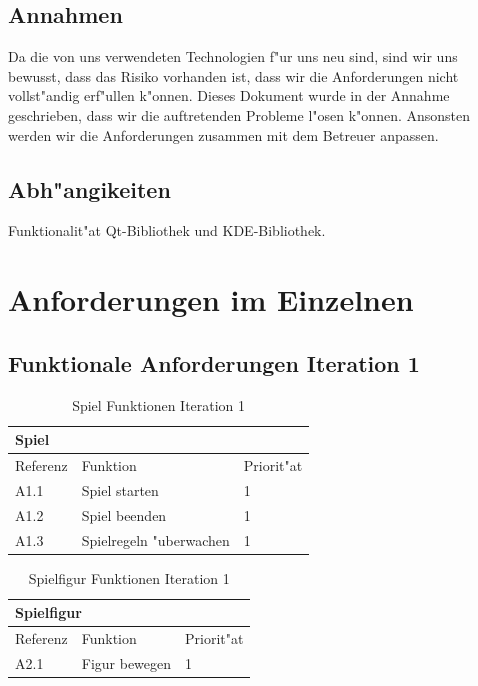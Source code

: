 \subsection{Annahmen}
Da die von uns verwendeten Technologien f"ur uns neu sind, sind wir uns bewusst, dass das Risiko vorhanden ist, dass wir
die Anforderungen nicht vollst"andig erf"ullen k"onnen. Dieses Dokument wurde in der Annahme geschrieben, dass wir die
auftretenden Probleme l"osen k"onnen. Ansonsten werden wir die Anforderungen zusammen mit dem Betreuer anpassen.

\subsection{Abh"angikeiten}
Funktionalit"at Qt-Bibliothek und KDE-Bibliothek.

\section{Anforderungen im Einzelnen}

\subsection{Funktionale Anforderungen Iteration 1}


\begin{table}[H]
  \begin{center}
    \begin{tabular}{|p{20mm}| p{85mm}| p{20mm}|}
    \multicolumn{3}{l}{\textbf{Spiel}} \\
    \hline Referenz & Funktion & Priorit"at \\
    \hline A1.1 & Spiel starten & 1 \\
    \hline A1.2 & Spiel beenden & 1 \\
    \hline A1.3 & Spielregeln "uberwachen & 1 \\
    \hline
    \end{tabular}
  \end{center}
  \caption{Spiel Funktionen Iteration 1}
\end{table}

\begin{table}[H]
  \begin{center}
    \begin{tabular}{|p{20mm}|p{85mm}|p{20mm}|}
    \multicolumn{3}{l}{\textbf{Spielfigur}} \\
    \hline Referenz & Funktion & Priorit"at \\
    \hline A2.1 & Figur bewegen & 1 \\
    \hline
    \end{tabular}
  \end{center}
  \caption{Spielfigur Funktionen Iteration 1}
\end{table}


